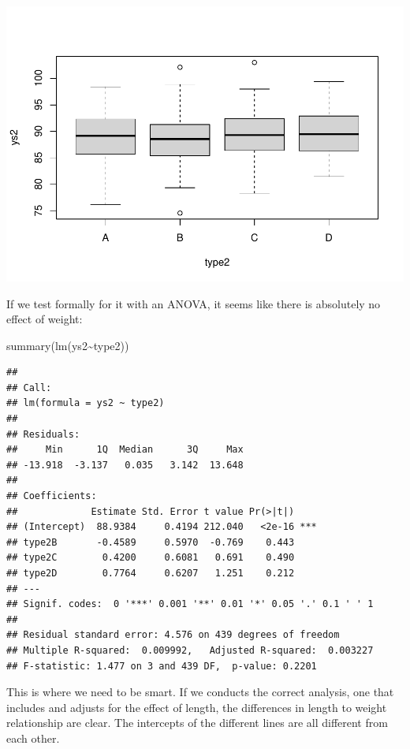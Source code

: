 \documentclass[
]{book}
\newenvironment{Shaded}{\begin{snugshade}}{\end{snugshade}}
\newcommand{\FunctionTok}[1]{\textcolor[rgb]{0.00,0.00,0.00}{#1}}
\newcommand{\NormalTok}[1]{#1}
\newcommand{\SpecialCharTok}[1]{\textcolor[rgb]{0.00,0.00,0.00}{#1}}
\begin{document}
\includegraphics{ECOMODbook_files/figure-latex/a10.12-1.pdf}

If we test formally for it with an ANOVA, it seems like there is absolutely no effect of weight:

\begin{Shaded}
\begin{Highlighting}[]
\FunctionTok{summary}\NormalTok{(}\FunctionTok{lm}\NormalTok{(ys2}\SpecialCharTok{\textasciitilde{}}\NormalTok{type2))}
\end{Highlighting}
\end{Shaded}

\begin{verbatim}
## 
## Call:
## lm(formula = ys2 ~ type2)
## 
## Residuals:
##     Min      1Q  Median      3Q     Max 
## -13.918  -3.137   0.035   3.142  13.648 
## 
## Coefficients:
##             Estimate Std. Error t value Pr(>|t|)    
## (Intercept)  88.9384     0.4194 212.040   <2e-16 ***
## type2B       -0.4589     0.5970  -0.769    0.443    
## type2C        0.4200     0.6081   0.691    0.490    
## type2D        0.7764     0.6207   1.251    0.212    
## ---
## Signif. codes:  0 '***' 0.001 '**' 0.01 '*' 0.05 '.' 0.1 ' ' 1
## 
## Residual standard error: 4.576 on 439 degrees of freedom
## Multiple R-squared:  0.009992,   Adjusted R-squared:  0.003227 
## F-statistic: 1.477 on 3 and 439 DF,  p-value: 0.2201
\end{verbatim}

This is where we need to be smart. If we conducts the correct analysis, one that includes and adjusts for the effect of length, the differences in length to weight relationship are clear. The intercepts of the different lines are all different from each other.
\end{document}
